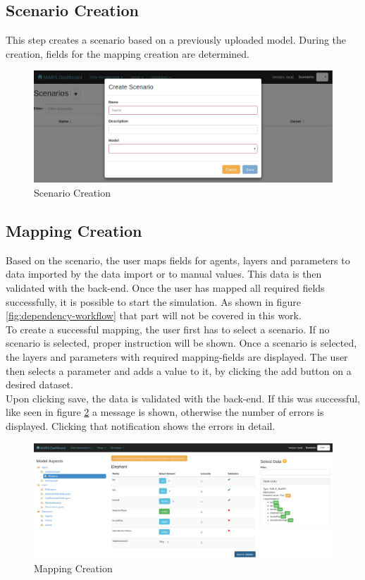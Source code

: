 \subsection{Scenario Creation}
This step creates a scenario based on a previously uploaded model. During the creation, fields for the mapping creation are determined.\\
\begin{figure}[H]
	\centering\includegraphics[width=1\textwidth]{res/workflow_scenario}
	\caption{Scenario Creation}
	\label{fig:scenario-ui}
\end{figure}


\subsection{Mapping Creation}
Based on the scenario, the user maps fields for agents, layers and parameters to data imported by the data import or to manual values. This data is then validated with the back-end. Once the user has mapped all required fields successfully, it is possible to start the simulation. As shown in figure \ref{fig:dependency-workflow} that part will not be covered in this work.\\
To create a successful mapping, the user first has to select a scenario. If no scenario is selected, proper instruction will be shown. Once a scenario is selected, the layers and parameters with required mapping-fields are displayed. The user then selects a parameter and adds a value to it, by clicking the add button on a desired dataset.\\
Upon clicking save, the data is validated with the back-end. If this was successful, like seen in figure \ref{fig:mapping-ui} a message is shown, otherwise the number of errors is displayed. Clicking that notification shows the errors in detail.
\begin{figure}[H]
	\centering\includegraphics[width=1\textwidth]{res/workflow_mapping}
	\caption{Mapping Creation}
	\label{fig:mapping-ui}
\end{figure}



